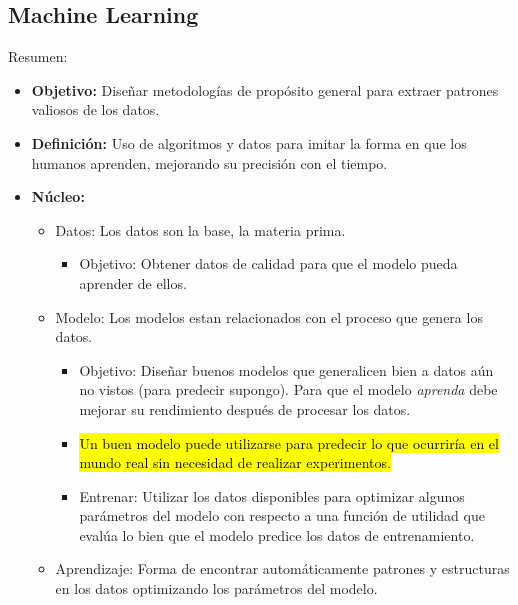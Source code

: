 \documentclass{templateApunte}
\newcommand{\hlcolor}[2]{{\sethlcolor{#1}\hl{#2}}}
\begin{document}
\subsection{Machine Learning} \hypertarget{libro}{}
Resumen:
\begin{itemize}
  \item \textbf{Objetivo:} Diseñar metodologías de propósito general para extraer patrones valiosos de los datos.
  \item \textbf{Definición:} Uso de algoritmos y datos para imitar la forma en que los humanos aprenden, mejorando su precisión con el tiempo.
  \item \textbf{Núcleo:}
  \begin{itemize}
    \item Datos: Los datos son la base, la materia prima.
    \begin{itemize}
      \item Objetivo: Obtener datos de calidad para que el modelo pueda aprender de ellos.
    \end{itemize}
    \item Modelo: Los modelos estan relacionados con el proceso que genera los datos.
    \begin{itemize}
      \item Objetivo: Diseñar buenos modelos que generalicen bien a datos aún no vistos (para predecir supongo). Para que el modelo \textit{aprenda} debe mejorar su rendimiento después de procesar los datos.
      \item \hlcolor{Celeste!50}{Un buen modelo puede utilizarse para predecir lo que ocurriría en el mundo real sin necesidad de realizar experimentos.}
      \item Entrenar: Utilizar los datos disponibles para optimizar algunos parámetros del modelo con respecto a una función de utilidad que evalúa lo bien que el modelo predice los datos de entrenamiento.
    \end{itemize}
    \item Aprendizaje: Forma de encontrar automáticamente patrones y estructuras en los datos optimizando los parámetros del modelo.
  \end{itemize}


\end{itemize}
\end{document}
